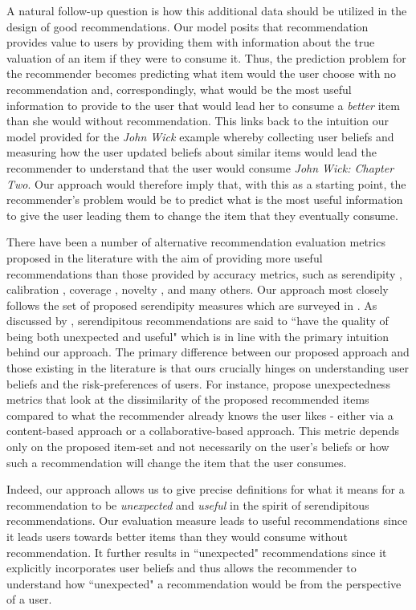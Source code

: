 \documentclass{article}
\begin{document}
\par 
A natural follow-up question is how this additional data should be utilized in the design of good recommendations. Our model posits that recommendation provides value to users by providing them with information about the true valuation of an item if they were to consume it. Thus, the prediction problem for the recommender becomes predicting what item would the user choose with no recommendation and, correspondingly, what would be the most useful information to provide to the user that would lead her to consume a \textit{better} item than she would without recommendation. This links back to the intuition our model provided for the \textit{John Wick} example whereby collecting user beliefs and measuring how the user updated beliefs about similar items would lead the recommender to understand that the user would consume \textit{John Wick: Chapter Two}. Our approach would therefore imply that, with this as a starting point, the recommender's problem would be to predict what is the most useful information to give the user leading them to change the item that they eventually consume.
\par 
There have been a number of alternative recommendation evaluation metrics proposed in the literature with the aim of providing more useful recommendations than those provided by accuracy metrics, such as serendipity \cite{kotkov2016survey}, calibration \cite{steck2018calibrated}, coverage \cite{ge2010beyond}, novelty \cite{vargas2011rank}, and many others. Our approach most closely follows the set of proposed serendipity measures which are surveyed in \cite{kotkov2016survey}. As discussed by \cite{maksai2015predicting},  serendipitous recommendations are said to ``have the quality of being both unexpected and useful" which is in line with the primary intuition behind our approach. The primary difference between our proposed approach and those existing in the literature is that ours crucially hinges on understanding user beliefs and the risk-preferences of users. For instance, \cite{vargas2011rank, kaminskas2014measuring} propose unexpectedness metrics that look at the dissimilarity of the proposed recommended items compared to what the recommender already knows the user likes - either via a content-based approach or a collaborative-based approach. This metric depends only on the proposed item-set and not necessarily on the user's beliefs or how such a recommendation will change the item that the user consumes.
\par 
Indeed, our approach allows us to give precise definitions for what it means for a recommendation to be \textit{unexpected} and \textit{useful} in the spirit of serendipitous recommendations. Our evaluation measure leads to useful recommendations since it leads users towards better items than they would consume without recommendation. It further results in ``unexpected" recommendations since it explicitly incorporates user beliefs and thus allows the recommender to understand how ``unexpected" a recommendation would be from the perspective of a user.




\end{document}
